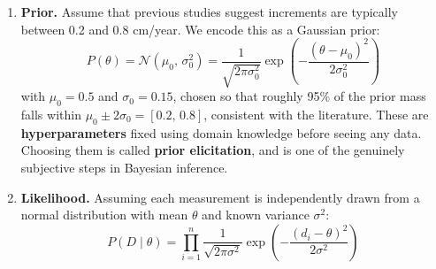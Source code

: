 \documentclass[12pt, a4paper]{article}
\begin{document}
\begin{enumerate}
\item \textbf{Prior.} Assume that previous studies suggest increments are
          typically between 0.2 and 0.8 cm/year. We encode this as a
          Gaussian prior:
          \[
              P(\theta) = \mathcal{N}(\mu_0,\, \sigma_0^2)
              = \frac{1}{\sqrt{2\pi\sigma_0^2}}
                \exp\!\left(-\frac{(\theta - \mu_0)^2}{2\sigma_0^2}\right)
          \]
          with $\mu_0 = 0.5$ and $\sigma_0 = 0.15$, chosen so that
          roughly 95\% of the prior mass falls within
          $\mu_0 \pm 2\sigma_0 = [0.2,\, 0.8]$, consistent with the
          literature. These are \textbf{hyperparameters} fixed using domain knowledge
          before seeing any data. Choosing them is called
          \textbf{prior elicitation}, and is one of the genuinely
          subjective steps in Bayesian inference.

    \item \textbf{Likelihood.} Assuming each measurement is
          independently drawn from a normal distribution with mean
          $\theta$ and known variance $\sigma^2$:
          \[
              P(D \mid \theta) = \prod_{i=1}^{n}
              \frac{1}{\sqrt{2\pi\sigma^2}}
              \exp\!\left(-\frac{(d_i - \theta)^2}{2\sigma^2}\right)
          \]


\end{enumerate}
\end{document}
